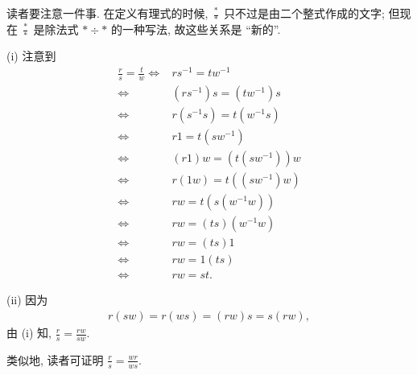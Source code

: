 \begin{remark}
    读者要注意一件事. 在定义有理式的时候, $\frac{\ast}{\ast}$ 只不过是由二个整式作成的文字; 但现在 $\frac{\ast}{\ast}$ 是除法式 $\ast \div \ast$ 的一种写法, 故这些关系是 ``新的''.
\end{remark}

\begin{pf}
    (i) 注意到
    \begin{align*}
        \frac{r}{s} = \frac{t}{w}
        \iff {} & rs^{-1} = tw^{-1}         \\
        \iff {} & (rs^{-1}) s = (tw^{-1}) s \\
        \iff {} & r(s^{-1} s) = t(w^{-1} s) \\
        \iff {} & r1 = t(sw^{-1})           \\
        \iff {} & (r1)w = (t(sw^{-1}))w     \\
        \iff {} & r(1w) = t((sw^{-1})w)     \\
        \iff {} & rw = t(s(w^{-1}w))        \\
        \iff {} & rw = (ts)(w^{-1}w)        \\
        \iff {} & rw = (ts)1                \\
        \iff {} & rw = 1(ts)                \\
        \iff {} & rw = st.
    \end{align*}

    (ii) 因为
    \begin{align*}
        r(sw) = r(ws) = (rw)s = s(rw),
    \end{align*}
    由 (i) 知, $\frac{r}{s} = \frac{rw}{sw}$.

    类似地, 读者可证明 $\frac{r}{s} = \frac{wr}{ws}$.


\end{pf}
